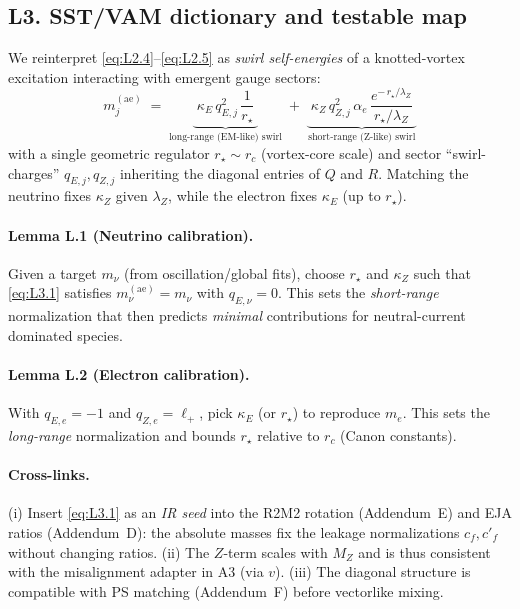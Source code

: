 \documentclass[11pt]{article}
\begin{document}
  \subsection*{L3. SST/VAM dictionary and testable map}

      We reinterpret \eqref{eq:L2.4}–\eqref{eq:L2.5} as \emph{swirl self-energies} of a knotted-vortex excitation interacting with emergent gauge sectors:
      \begin{equation}
      \boxed{~
      m_j^{(\text{ae})}
          \;=\;
          \underbrace{\;\kappa_E\,q_{E,j}^2\,\frac{1}{r_\star}\;}_{\text{long-range (EM-like) swirl}}
          \;+\;
          \underbrace{\;\kappa_Z\,q_{Z,j}^2\,\alpha_e\,
          \frac{e^{-\,r_\star/\lambda_Z}}{\,r_\star/\lambda_Z\,}\;}_{\text{short-range (Z-like) swirl}}
          ~}
      \label{eq:L3.1}
      \end{equation}
      with a single geometric regulator $r_\star\sim r_c$ (vortex-core scale) and sector ``swirl-charges'' $q_{E,j},q_{Z,j}$ inheriting the diagonal entries of $Q$ and $R$. Matching the neutrino fixes $\kappa_Z$ given $\lambda_Z$, while the electron fixes $\kappa_E$ (up to $r_\star$).

      \paragraph{Lemma L.1 (Neutrino calibration).}
          Given a target $m_\nu$ (from oscillation/global fits), choose $r_\star$ and $\kappa_Z$ such that \eqref{eq:L3.1} satisfies $m_\nu^{(\text{ae})}=m_\nu$ with $q_{E,\nu}=0$. This sets the \emph{short-range} normalization that then predicts \emph{minimal} contributions for neutral-current dominated species.

      \paragraph{Lemma L.2 (Electron calibration).}
          With $q_{E,e}=-1$ and $q_{Z,e}=\ell_+$, pick $\kappa_E$ (or $r_\star$) to reproduce $m_e$. This sets the \emph{long-range} normalization and bounds $r_\star$ relative to $r_c$ (Canon constants).

      \paragraph{Cross-links.}
      (i) Insert \eqref{eq:L3.1} as an \emph{IR seed} into the R2M2 rotation (Addendum~E) and EJA ratios (Addendum~D): the absolute masses fix the leakage normalizations $c_f,c'_f$ without changing ratios.
          (ii) The $Z$-term scales with $M_Z$ and is thus consistent with the misalignment adapter in A3 (via $v$).
          (iii) The diagonal structure is compatible with PS matching (Addendum~F) before vectorlike mixing.
\end{document}
